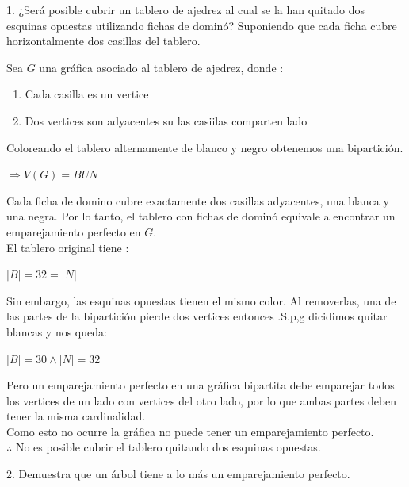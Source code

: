 \documentclass{article}
\begin{document}
	\begin{justify}
		1. ¿Será posible cubrir un tablero de ajedrez al cual se la han quitado dos esquinas opuestas utilizando fichas de dominó? 
		Suponiendo que cada ficha cubre horizontalmente
		dos casillas del tablero.
	\end{justify}
	Sea $G$ una gráfica asociado al tablero de ajedrez, donde : \\
	\begin{enumerate}
	\item Cada casilla es un vertice
	\item Dos vertices son adyacentes su las casiilas comparten lado
	\end{enumerate}	

	Coloreando el tablero alternamente de blanco y negro obtenemos una bipartición. \\
	\begin{center}
	$\Rightarrow   V(G) = B U N$ \\
	\end{center}
	Cada ficha de domino cubre exactamente dos casillas adyacentes, una blanca y una negra. Por lo tanto, el tablero con fichas de dominó
	equivale a encontrar un emparejamiento perfecto en $G$. \\
	El tablero original tiene : \\
	\begin{center}
	$|B| = 32 = |N|$ \\
	\end{center}
	Sin embargo, las esquinas opuestas tienen el mismo color. Al removerlas, una de las partes de la bipartición pierde dos vertices entonces
	.S.p,g dicidimos quitar blancas y nos queda: \\
	\begin{center}
	$|B| = 30 \wedge |N| = 32$ \\
	\end{center}
	Pero un emparejamiento perfecto en una gráfica bipartita debe emparejar todos los vertices de un lado con vertices del otro lado, por lo que
	ambas partes deben tener la misma cardinalidad. \\
 	\newline Como esto no ocurre la gráfica no puede tener un emparejamiento perfecto. \\
	$\therefore$ No es posible cubrir el tablero quitando dos esquinas opuestas. \\
	\newpage
	\begin{justify}
	2. Demuestra que un árbol tiene a lo más un emparejamiento perfecto.
	\end{justify}
\end{document}
